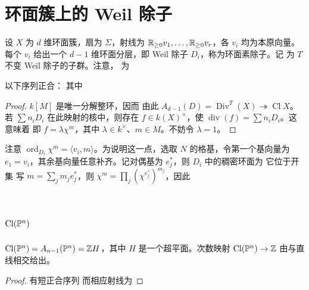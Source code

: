 \section{环面簇上的 Weil 除子}
设 $X$ 为 $d$ 维环面簇，扇为 $\Sigma$，射线为 $\mathbb R_{\ge0}v_1,\ldots,\mathbb R_{\ge0}v_r$，各 $v_i$ 均为本原向量。每个 $v_i$ 给出一个 $d-1$ 维环面分层，即 Weil 除子 $D_i$，称为环面素除子。记
为 $T$ 不变 Weil 除子的子群。注意，
为
\begin{proposition}\label{prop:4.14}
以下序列正合：
其中
\end{proposition}
\begin{proof}
$k[M]$ 是唯一分解整环，因而
由此 $A_{d-1}(D)=\operatorname{Div}^T(X)\twoheadrightarrow\operatorname{Cl}X$。
若 $\sum n_iD_i$ 在此映射的核中，则存在 $f\in k(X)^\times$，使 $\operatorname{div}(f)=\sum n_iD_i$。这意味着
即 $f=\lambda\chi^m$，其中 $\lambda\in k^\times$、$m\in M$。不妨令 $\lambda=1$。
\end{proof}
注意 $\operatorname{ord}_{D_i}\chi^m=\langle v_i,m\rangle$。为说明这一点，选取 $N$ 的格基，令第一个基向量为 $e_1=v_i$，其余基向量任意补齐。记对偶基为 $e_j^*$，则 $D_i$ 中的稠密环面为
它位于开集
写 $m=\sum_jm_je_j^*$，则 $\chi^m=\prod_j(\chi^{e_j^*})^{m_j}$，因此
\section{\texorpdfstring{$\operatorname{Cl}(\mathbb P^n)$}{Cl(Pⁿ)}}
\begin{corollary}\label{cor:4.15}
$\operatorname{Cl}(\mathbb P^n)=A_{n-1}(\mathbb P^n)=\mathbb Z H$，其中 $H$ 是一个超平面。次数映射 $\operatorname{Cl}(\mathbb P^n)\to\mathbb Z$ 由与直线相交给出。
\end{corollary}
\begin{proof}
有短正合序列
而相应射线为
\end{proof}
